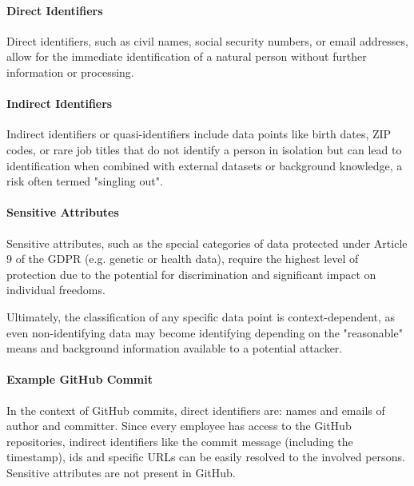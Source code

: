 \paragraph{Direct Identifiers}

Direct identifiers, such as civil names, social security numbers, or email addresses, allow for the immediate identification of a natural person without further information or processing.
\autocite[87--88]{Krebs2022}
\autocite[37, 71]{gmdsbvd2024praxishilfe}

\paragraph{Indirect Identifiers}

Indirect identifiers or quasi-identifiers include data points like birth dates, ZIP codes, or rare job titles that do not identify a person in isolation but can lead to identification when combined with external datasets or background knowledge, a risk often termed "singling out".
\autocite[87--88]{Krebs2022}
\autocite[5, 13]{schwartmann2022praxisleitfaden}
\autocite[37]{gmdsbvd2024praxishilfe}

\paragraph{Sensitive Attributes}

Sensitive attributes, such as the special categories of data protected under Article 9 of the \ac{GDPR} (e.g. genetic or health data), require the highest level of protection due to the potential for discrimination and significant impact on individual freedoms.
\autocite[131--133]{Krebs2022}
\autocite[8, 24--25]{gmdsbvd2024praxishilfe}

Ultimately, the classification of any specific data point is context-dependent, as even non-identifying data may become identifying depending on the "reasonable" means and background information available to a potential attacker. 
\autocite[36--37, 54]{gmdsbvd2024praxishilfe}

\paragraph{Example GitHub Commit}

In the context of GitHub commits, direct identifiers are: names and emails of author and committer. Since every employee has access to the GitHub repositories, indirect identifiers like the commit message (including the timestamp), ids and specific URLs can be easily resolved to the involved persons. Sensitive attributes are not present in GitHub.


